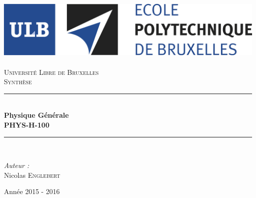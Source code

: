 \AddToShipoutPicture*{\BackgroundPic}
\begin{titlepage}
\begin{center}	
	
	\newcommand{\HRule}{\rule{\linewidth}{0.5mm}}   			            %
	\includegraphics[scale=0.11]{titlepage/logo.jpg}~\\[1cm]				%

	\textsc{\LARGE Université Libre de Bruxelles}\\[1.5cm]
	\textsc{\Large Synthèse}\\[0.5cm]

	\HRule \\[0.4cm]
	{ \huge \bfseries Physique Générale \ \\PHYS-H-100 \\[0.4cm] }


	\HRule \\[1.5cm]
		\begin{minipage}{0.4\textwidth}
		\begin{flushleft} \large
		
		\emph{Auteur :}\\
			Nicolas \textsc{Englebert}

			\end{flushleft}
			\end{minipage}
			\begin{minipage}{0.4\textwidth}
			\begin{flushright} \large
			\end{flushright}
		\end{minipage}

	\vfill

{\large Année 2015 - 2016}

\end{center}
\end{titlepage}